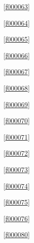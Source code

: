 \noindent\filesourcenumbernameone\ \ref{f000063}\dotfill\pageref{f000063}%

\noindent\filesourcenumbernameone\ \ref{f000064}\dotfill\pageref{f000064}%

\noindent\filesourcenumbernameone\ \ref{f000065}\dotfill\pageref{f000065}%

\noindent\filesourcenumbernameone\ \ref{f000066}\dotfill\pageref{f000066}%

\noindent\filesourcenumbernameone\ \ref{f000067}\dotfill\pageref{f000067}%

\noindent\filesourcenumbernameone\ \ref{f000068}\dotfill\pageref{f000068}%

\noindent\filesourcenumbernameone\ \ref{f000069}\dotfill\pageref{f000069}%

\noindent\filesourcenumbernameone\ \ref{f000070}\dotfill\pageref{f000070}%

\noindent\filesourcenumbernameone\ \ref{f000071}\dotfill\pageref{f000071}%

\noindent\filesourcenumbernameone\ \ref{f000072}\dotfill\pageref{f000072}%

\noindent\filesourcenumbernameone\ \ref{f000073}\dotfill\pageref{f000073}%

\noindent\filesourcenumbernameone\ \ref{f000074}\dotfill\pageref{f000074}%

\noindent\filesourcenumbernameone\ \ref{f000075}\dotfill\pageref{f000075}%

\noindent\filesourcenumbernameone\ \ref{f000076}\dotfill\pageref{f000076}%

\noindent\filesourcenumbernameone\ \ref{f000080}\dotfill\pageref{f000080}%









